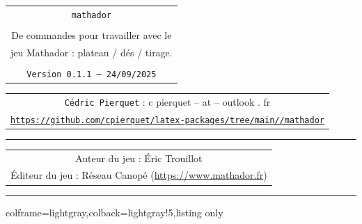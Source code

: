 \documentclass[11pt,a4paper]{ltxdoc}
\def\TPversion{0.1.1}
\def\TPdate{24/09/2025}
\begin{document}
\thispagestyle{empty}

\begin{center}
	\begin{minipage}{0.88\linewidth}
		\begin{tcolorbox}[colframe=yellow,colback=yellow!15]
			\begin{center}
				\renewcommand{\arraystretch}{1.25}%
				\begin{tabular}{c}
					{\Huge \texttt{mathador}}\\
					\\
					{\LARGE De commandes pour travailler avec le} \\
					{\LARGE jeu Mathador : plateau / dés / tirage.} \\
					\\
					{\small \texttt{Version \TPversion{} -- \TPdate}}
				\end{tabular}
			\end{center}
		\end{tcolorbox}
	\end{minipage}
\end{center}

\begin{center}
	\begin{tabular}{c}
		\texttt{Cédric Pierquet} : {\ttfamily c pierquet -- at -- outlook . fr}\\
		\texttt{\url{https://github.com/cpierquet/latex-packages/tree/main//mathador}} \\
	\end{tabular}
\end{center}

\hrule

\begin{center}
	\begin{tabular}{c}
		{\ttfamily Auteur du jeu :  Éric Trouillot}\\
		{\ttfamily Éditeur du jeu :  Réseau Canopé (\url{https://www.mathador.fr})}
	\end{tabular}
\end{center}

\hrule

\vfill

\begin{tcblisting}{colframe=lightgray,colback=lightgray!5,listing only}
\end{tcblisting}

\begin{tcolorbox}[colframe=lightgray,colback=lightgray!5]
\hfill{}\hfill\null
\end{tcolorbox}
\end{document}
